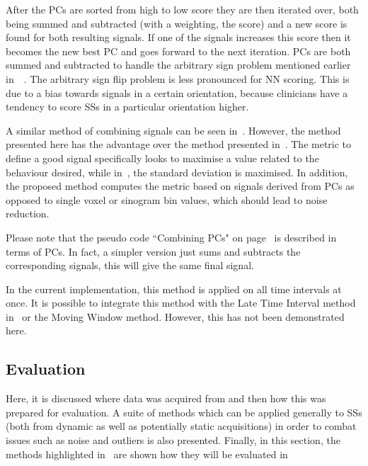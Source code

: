                     After the \glspl{PC} are sorted from high to low score they are then iterated over, both being summed and subtracted (with a weighting, the score) and a new score is found for both resulting signals. If one of the signals increases this score then it becomes the new best \gls{PC} and goes forward to the next iteration. \glspl{PC} are both summed and subtracted to handle the arbitrary sign problem mentioned earlier in~~\parencite{Bertolli2017}. The arbitrary sign flip problem is less pronounced for \gls{NN} scoring. This is due to a bias towards signals in a certain orientation, because clinicians have a tendency to score \glspl{SS} in a particular orientation higher.
                    
                    A similar method of combining signals can be seen in~\parencite{Kesner2010AMethods}. However, the method presented here has the advantage over the method presented in~\parencite{Kesner2010AMethods}. The metric to define a good signal specifically looks to maximise a value related to the behaviour desired, while in~\parencite{Kesner2010AMethods}, the standard deviation is maximised. In addition, the proposed method computes the metric based on signals derived from \glspl{PC} as opposed to single voxel or sinogram bin values, which should lead to noise reduction.
                    
                    Please note that the pseudo code ``Combining \glspl{PC}" on page~\pageref{alg:pca_data_driven_surrogate_signal_extraction_methods_for_dynamic_pet_methods_score_select_and_combine_method_combine_combine_pseudo_code} is described in terms of \glspl{PC}. In fact, a simpler version just sums and subtracts the corresponding signals, this will give the same final signal. 
                
                    In the current implementation, this method is applied on all time intervals at once. It is possible to integrate this method with the Late Time Interval method in~ or the Moving Window method. However, this has not been demonstrated here.
                    
        \subsection{Evaluation} \label{sec:pca_data_driven_surrogate_signal_extraction_methods_for_dynamic_pet_evaluation}
            Here, it is discussed where data was acquired from and then how this was prepared for evaluation. A suite of methods which can be applied generally to \glspl{SS} (both from dynamic as well as potentially static acquisitions) in order to combat issues such as noise and outliers is also presented. Finally, in this section, the methods highlighted in~ are shown how they will be evaluated in~

